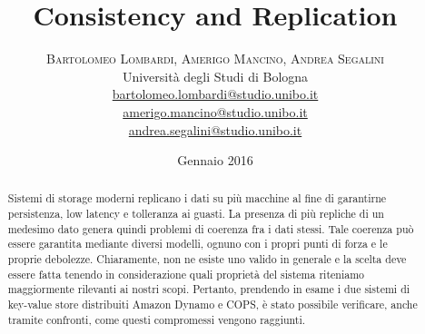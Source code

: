 \documentclass[twoside]{article}
\title{\vspace{-15mm}\fontsize{24pt}{10pt}\selectfont\textbf{Consistency and Replication}} %
\author{
\large
\textsc{Bartolomeo Lombardi, Amerigo Mancino, Andrea Segalini}\\[2mm] %
\normalsize Università degli Studi di Bologna %
\vspace{5mm} \\
\normalsize \href{mailto:bartolomeo.lombardi@studio.unibo.it}{bartolomeo.lombardi@studio.unibo.it}\\
\normalsize \href{mailto:amerigo.mancino@studio.unibo.it}{amerigo.mancino@studio.unibo.it}\\
\normalsize \href{mailto:andrea.segalini@studio.unibo.it}{andrea.segalini@studio.unibo.it}
\vspace{-5mm}
}
\date{Gennaio 2016}
\begin{document}
\maketitle 


\begin{abstract}
\noindent
Sistemi di storage moderni replicano i dati su più macchine al fine di garantirne persistenza, low latency e tolleranza ai guasti. La presenza di più repliche di un medesimo dato genera quindi problemi di coerenza fra i dati stessi. Tale coerenza può essere garantita mediante diversi modelli, ognuno con i propri punti di forza e le proprie debolezze. Chiaramente, non ne esiste uno valido in generale e la scelta deve essere fatta tenendo in considerazione quali proprietà del sistema riteniamo maggiormente rilevanti ai nostri scopi. Pertanto, prendendo in esame i due sistemi di key-value store distribuiti Amazon Dynamo e COPS, è stato possibile verificare, anche tramite confronti, come questi compromessi vengono raggiunti.
\end{abstract}


\vspace{20mm} %

\end{document}
